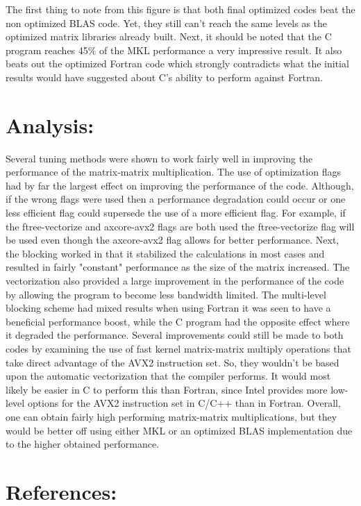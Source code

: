\documentclass{article}
\begin{document}
\noindent The first thing to note from this figure is that both final optimized codes beat the non optimized BLAS code. Yet, they still can't reach the same levels as the optimized matrix libraries already built. Next, it should be noted that the C program reaches 45\% of the MKL performance a very impressive result. It also beats out the optimized Fortran code which strongly contradicts what the initial results would have suggested about C's ability to perform against Fortran. 

\section*{Analysis:}

Several tuning methods were shown to work fairly well in improving the performance of the matrix-matrix multiplication. The use of optimization flags had by far the largest effect on improving the performance of the code. Although, if the wrong flags were used then a performance degradation could occur or one less efficient flag could supersede the use of a more efficient flag. For example, if the ftree-vectorize and axcore-avx2 flags are both used the ftree-vectorize flag will be used even though the axcore-avx2 flag allows for better performance.  Next, the blocking worked in that it stabilized the calculations in most cases and resulted in fairly "constant" performance as the size of the matrix increased. The vectorization also provided a large improvement in the performance of the code by allowing the program to become less bandwidth limited. The multi-level blocking scheme had mixed results when using Fortran it was seen to have a beneficial performance boost, while the C program had the opposite effect where it degraded the performance.  Several improvements could still be made to both codes by examining the use of fast kernel matrix-matrix multiply operations that take direct advantage of the AVX2 instruction set. So, they wouldn't be based upon the automatic vectorization that the compiler performs. It would most likely be easier in C to perform this than Fortran, since Intel provides more low-level options for the AVX2 instruction set in C/C++ than in Fortran. Overall, one can obtain fairly high performing matrix-matrix multiplications, but they would be better off using either MKL or an optimized BLAS implementation due to the higher obtained performance.

\section*{References:}
\end{document}
